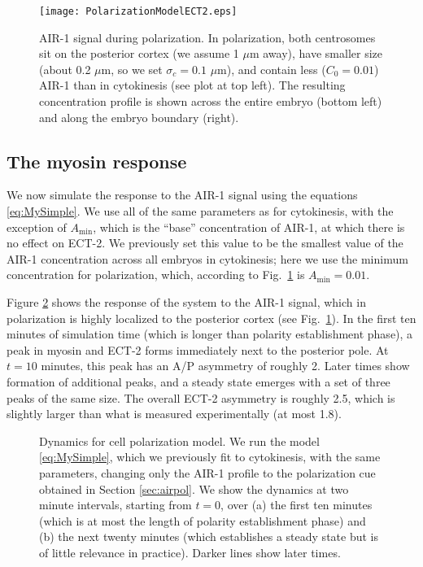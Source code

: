 \documentclass[11pt]{article}
\begin{document}
\begin{figure}
\centering
\texttt{[image: PolarizationModelECT2.eps]}
\caption{\label{fig:AIRPol}AIR-1 signal during polarization. In polarization, both centrosomes sit on the posterior cortex (we assume 1 $\mu$m away), have smaller size (about 0.2 $\mu$m, so we set $\sigma_c=0.1$ $\mu$m), and contain less ($C_0=0.01$) AIR-1 than in cytokinesis (see plot at top left). The resulting concentration profile is shown across the entire embryo (bottom left) and along the embryo boundary (right).}
\end{figure}

\subsection{The myosin response}
We now simulate the response to the AIR-1 signal using the equations \eqref{eq:MySimple}. We use all of the same parameters as for cytokinesis, with the exception of $A_\text{min}$, which is the ``base'' concentration of AIR-1, at which there is no effect on ECT-2. We previously set this value to be the smallest value of the AIR-1 concentration across all embryos in cytokinesis; here we use the minimum concentration for polarization, which, according to Fig.\ \ref{fig:AIRPol} is $A_\text{min}=0.01$. 

Figure \ref{fig:TryFlowsPol} shows the response of the system to the AIR-1 signal, which in polarization is highly localized to the posterior cortex (see Fig.\ \ref{fig:AIRPol}). In the first ten minutes of simulation time (which is longer than polarity establishment phase), a peak in myosin and ECT-2 forms immediately next to the posterior pole. At $t=10$ minutes, this peak has an A/P asymmetry of roughly 2. Later times show formation of additional peaks, and a steady state emerges with a set of three peaks of the same size. The overall ECT-2 asymmetry is roughly 2.5, which is slightly larger than what is measured experimentally (at most 1.8).

\begin{figure}
\centering
{}
\caption{\label{fig:TryFlowsPol}Dynamics for cell polarization model. We run the model \eqref{eq:MySimple}, which we previously fit to cytokinesis, with the same parameters, changing only the AIR-1 profile to the polarization cue obtained in Section \ref{sec:airpol}. We show the dynamics at two minute intervals, starting from $t=0$, over (a) the first ten minutes (which is at most the length of polarity establishment phase) and (b) the next twenty minutes (which establishes a steady state but is of little relevance in practice). Darker lines show later times.}
\end{figure}
\end{document}
